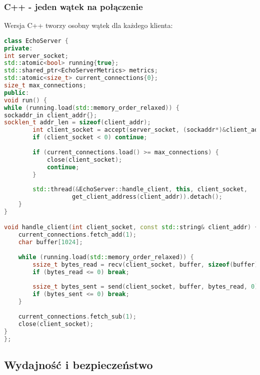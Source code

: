 \subsubsection{C++ - jeden wątek na połączenie}
Wersja C++ tworzy osobny wątek dla każdego klienta:
\begin{lstlisting}[language=C++, caption={Echo Serwer w C++ z jednym wątkiem na połączenie}, label={lst:cpp_echo_server}]
class EchoServer {
private:
int server_socket;
std::atomic<bool> running{true};
std::shared_ptr<EchoServerMetrics> metrics;
std::atomic<size_t> current_connections{0};
size_t max_connections;
public:
void run() {
while (running.load(std::memory_order_relaxed)) {
sockaddr_in client_addr{};
socklen_t addr_len = sizeof(client_addr);
        int client_socket = accept(server_socket, (sockaddr*)&client_addr, &addr_len);
        if (client_socket < 0) continue;
        
        if (current_connections.load() >= max_connections) {
            close(client_socket);
            continue;
        }
        
        std::thread(&EchoServer::handle_client, this, client_socket, 
                   get_client_address(client_addr)).detach();
    }
}

void handle_client(int client_socket, const std::string& client_addr) {
    current_connections.fetch_add(1);
    char buffer[1024];
    
    while (running.load(std::memory_order_relaxed)) {
        ssize_t bytes_read = recv(client_socket, buffer, sizeof(buffer), 0);
        if (bytes_read <= 0) break;
        
        ssize_t bytes_sent = send(client_socket, buffer, bytes_read, 0);
        if (bytes_sent <= 0) break;
    }
    
    current_connections.fetch_sub(1);
    close(client_socket);
}
};
\end{lstlisting}

\subsection{Wydajność i bezpieczeństwo}

